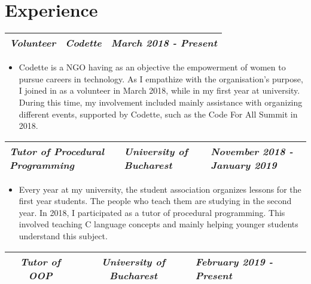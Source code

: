 \documentclass{article}
\begin{document}
    
    \section*{ Experience }
        \setlength{\tabcolsep}{65pt}
        \begin{tabular} {ccL{3cm}}
            \small\textit{\textbf{Volunteer}} 
            & \small\textit{\textbf{Codette}} 
            & \small\textit{\textbf{March 2018 - Present}}\\
            \hline
        \end{tabular}

        \begin{itemize}
            \item \footnotesize Codette is a NGO having as an objective the empowerment of women to pursue careers in technology. As I empathize with the organisation's purpose, I joined in as a volunteer in March 2018, while in my first year at university. During this time, my involvement included mainly assistance with organizing different events, supported by Codette, such as the Code For All Summit in 2018.
        \end{itemize}

        \setlength{\tabcolsep}{20pt}
        \begin{tabular} {C{5cm}L{5cm}C{3cm}}
            \small\textit{\textbf{Tutor of Procedural Programming}} 
            & \small\textit{\textbf{University of Bucharest}} 
            & \small\textit{\textbf{November 2018 - January 2019}}\\
            \hline
        \end{tabular}

        \begin{itemize}
            \item \footnotesize Every year at my university, the student association organizes lessons for the first year students. The people who teach them are studying in the second year. In 2018, I participated as a tutor of procedural programming. This involved teaching C language concepts and mainly helping younger students understand this subject.
        \end{itemize}

        \setlength{\tabcolsep}{45pt}
        \begin{tabular} {ccC{3cm}}
            \small\textit{\textbf{Tutor of OOP}} 
            & \small\textit{\textbf{University of Bucharest}} 
            & \small\textit{\textbf{February 2019 - Present}}\\
            \hline
        \end{tabular}
\end{document}
